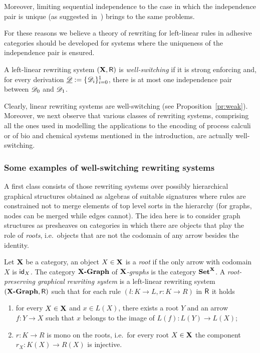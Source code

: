 Moreover, limiting sequential independence to the case in which the independence
	pair is unique (as suggested in~\cite{baldan2017domains}) brings to the same problems.

For these reasons we believe a theory of rewriting for
left-linear rules in adhesive categories should be developed for
systems where the uniqueness of the independence pair is ensured.

\begin{definition}
	A left-linear rewriting system $(\textbf {\textup{X}}, \mathsf{R})$ is \emph{well-switching} if it is strong enforcing and, for every derivation $\underline{\mathscr{D}}:=\{\mathscr{D}_{i}\}_{i=0}^1$, there is at most one independence pair between $\mathscr{D}_0$ and $\mathscr{D}_1$.
\end{definition}


Clearly, linear rewriting systems are well-switching (see Proposition~\ref{pr:weak}).
Moreover, we next observe that various classes of rewriting systems,
comprising all the ones used in modelling the applications to the
encoding of process calculi or of bio and chemical systems mentioned
in the introduction, are actually well-switching.

\subsubsection{Some examples of well-switching rewriting systems}


A first class consists of those rewriting systems over
possibly hierarchical graphical structures obtained as algebras of
suitable signatures where rules are constrained not to merge elements
of top level sorts in the hierarchy (for graphs, nodes can be
merged while edges cannot). The idea here is to consider graph
structures as presheaves on categories in which there are objects that play 
the role of \emph{roots}, i.e.~objects that are not the codomain of 
any arrow besides the identity. 

\begin{definition}
	Let $\textbf {\textup{X}}$ be a category, an object $X\in \textbf {\textup{X}}$ is a \emph{root} if the only arrow with codomain $X$ is $\mathsf{id}_{X}$.
	The category $\textbf{\textup{{X}-Graph}}$ of \emph{$\textbf {\textup{X}}$-graphs} is the category
	$\textbf {\textup{Set}}^{\textbf {\textup{X}}}$. A
	\emph{root-preserving graphical rewriting system} is a left-linear
	rewriting system $(\textbf{\textup{{X}-Graph}}, \mathsf{R})$ such that for each rule
	$(l\colon K\to L, r\colon K\to R)$ in $\mathsf{R}$ it holds
	\begin{enumerate}
		\item for every $X\in \textbf {\textup{X}}$ and $x\in L(X)$, there exists a root $Y$
		and an arrow $f\colon Y\to X$ such that $x$ belongs to the image of
		$L(f)\colon L(Y)\to L(X)$;
		\item $r\colon K\to R$ is mono on the roots, i.e.~for every root $X\in \textbf {\textup{X}}$ the component $r_X:K(X)\to R(X)$ is injective.
	\end{enumerate}
\end{definition}

